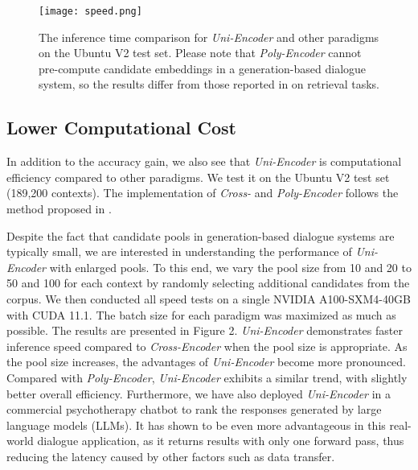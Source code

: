 \begin{figure}[ht]

  \centering

  \texttt{[image: speed.png]}

\caption{The inference time comparison for \textit{Uni-Encoder} and other paradigms on the Ubuntu V2 test set. Please note that \textit{Poly-Encoder} cannot pre-compute candidate embeddings in a generation-based dialogue system, so the results differ from those reported in \citet{humeau2019poly} on retrieval tasks.}
\label{tab:speed}

\end{figure}









\subsection{Lower Computational Cost} \label{speed}
In addition to the accuracy gain, we also see that \textit{Uni-Encoder} is computational efficiency compared to other paradigms. We test it on the Ubuntu V2 test set (189,200 contexts). The implementation of \textit{Cross-} and \textit{Poly-Encoder} follows the method proposed in \citet{humeau2019poly}.


Despite the fact that candidate pools in generation-based dialogue systems are typically small, we are interested in understanding the performance of \textit{Uni-Encoder} with enlarged pools. To this end, we vary the pool size from 10 and 20 to 50 and 100 for each context by randomly selecting additional candidates from the corpus. We then conducted all speed tests on a single NVIDIA A100-SXM4-40GB with CUDA 11.1. The batch size for each paradigm was maximized as much as possible.
The results are presented in Figure 2. \textit{Uni-Encoder} demonstrates  faster inference speed compared to \textit{Cross-Encoder} when the pool size is appropriate. As the pool size increases, the advantages of \textit{Uni-Encoder} become more pronounced. Compared with \textit{Poly-Encoder}, \textit{Uni-Encoder} exhibits a similar trend, with slightly better overall efficiency. Furthermore, we have also deployed \textit{Uni-Encoder} in a commercial psychotherapy chatbot to rank the responses generated by large language models (LLMs). It has shown to be even more advantageous in this real-world dialogue application, as it returns results with only one forward pass, thus reducing the latency caused by other factors such as data transfer.


















